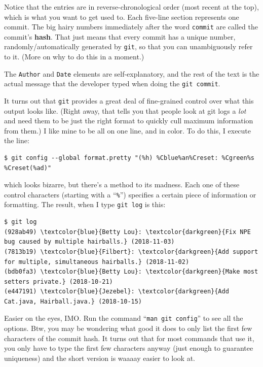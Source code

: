 Notice that the entries are in reverse-chronological order (most recent at the
top), which is what you want to get used to. Each five-line section represents
one commit. The big hairy numbers immediately after the word \texttt{commit}
are called the commit's \textbf{hash}. That just means that every commit has a
unique number, randomly/automatically generated by \texttt{git}, so that you
can unambiguously refer to it. (More on why to do this in a moment.)

The \texttt{Author} and \texttt{Date} elements are self-explanatory, and the
rest of the text is the actual message that the developer typed when doing the
\texttt{git commit}.

It turns out that \texttt{git} provides a great deal of fine-grained control
over what this output looks like. (Right away, that tells you that people look
at git logs a \textit{lot} and need them to be just the right format to
quickly cull maximum information from them.) I like mine to be all on one
line, and in color. To do this, I execute the line:

\begin{Verbatim}[fontsize=\footnotesize,samepage=true,frame=none]
$ git config --global format.pretty "(%h) %Cblue%an%Creset: %Cgreen%s %Creset(%ad)"
\end{Verbatim}

which looks bizarre, but there's a method to its madness. Each one of these
control characters (starting with a ``\texttt{\%}'') specifies a certain piece
of information or formatting. The result, when I type \texttt{git log} is
this:

\begin{Verbatim}[commandchars=\\\{\},fontsize=\footnotesize,samepage=true,frame=single]
$ git log
(928ab49) \textcolor{blue}{Betty Lou}: \textcolor{darkgreen}{Fix NPE bug caused by multiple hairballs.} (2018-11-03)
(7813b19) \textcolor{blue}{Filbert}: \textcolor{darkgreen}{Add support for multiple, simultaneous hairballs.} (2018-11-02)
(bdb0fa3) \textcolor{blue}{Betty Lou}: \textcolor{darkgreen}{Make most setters private.} (2018-10-21)
(e447191) \textcolor{blue}{Jezebel}: \textcolor{darkgreen}{Add Cat.java, Hairball.java.} (2018-10-15)
\end{Verbatim}

Easier on the eyes, IMO. Run the command ``\texttt{man git config}'' to see
all the options. Btw, you may be wondering what good it does to only list the
first few characters of the commit hash. It turns out that for most commands
that use it, you only have to type the first few characters anyway (just
enough to guarantee uniqueness) and the short version is waaaay easier to look
at.

